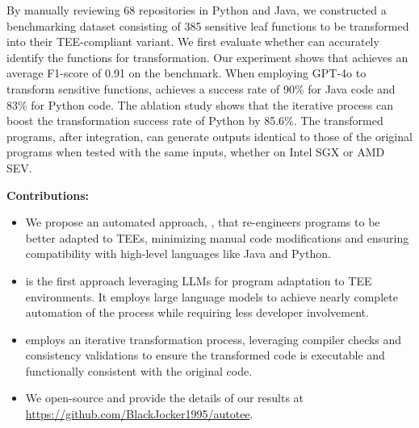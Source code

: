 By manually reviewing 68 repositories in Python and Java, we constructed a benchmarking dataset consisting of 385 sensitive leaf functions to be transformed into their TEE-compliant variant.
We first evaluate whether \system can accurately identify the functions for transformation. Our experiment shows that \system achieves an average F1-score of 0.91 on the benchmark.
When employing GPT-4o to transform sensitive functions, \system achieves a success rate of 90\% for Java code and 83\% for Python code.
The ablation study shows that the iterative process can boost the transformation success rate of Python by 85.6\%.
The transformed programs, after integration, can generate outputs identical to those of the original programs when tested with the same inputs, whether on Intel SGX or AMD SEV.

\vspace{0.1cm}
\noindent
\textbf{Contributions:}
\begin{itemize}[leftmargin=*]
\item We propose an automated approach, \system, that re-engineers programs to be better adapted to TEEs, minimizing manual code modifications and ensuring compatibility with high-level languages like Java and Python.

\item \system is the first approach leveraging LLMs for program adaptation to TEE environments. It employs large language models to achieve nearly complete automation of the process while requiring less developer involvement.

\item \system employs an iterative transformation process, leveraging compiler checks and consistency validations to ensure the transformed code is executable and functionally consistent with the original code.

\item We open-source \system and provide the details of our results at \url{https://github.com/BlackJocker1995/autotee}.

\end{itemize}